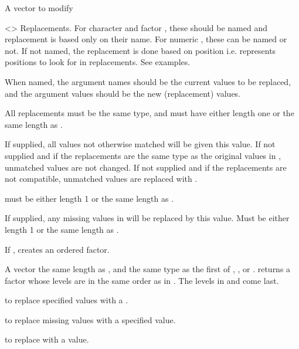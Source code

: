 \documentclass[a4paper]{book}
\begin{document}
\begin{Arguments}
\begin{ldescription}
\item[\code{.x}] A vector to modify

\item[\code{...}] <> Replacements. For character and factor , these should be named
and replacement is based only on their name. For numeric , these can be
named or not. If not named, the replacement is done based on position i.e.
 represents positions to look for in replacements. See examples.

When named, the argument names should be the current values to be replaced, and the
argument values should be the new (replacement) values.

All replacements must be the same type, and must have either
length one or the same length as .

\item[\code{.default}] If supplied, all values not otherwise matched will
be given this value. If not supplied and if the replacements are
the same type as the original values in , unmatched
values are not changed. If not supplied and if the replacements
are not compatible, unmatched values are replaced with .

 must be either length 1 or the same length as
.

\item[\code{.missing}] If supplied, any missing values in  will be
replaced by this value. Must be either length 1 or the same length as
.

\item[\code{.ordered}] If ,  creates an
ordered factor.
\end{ldescription}
\end{Arguments}
%
\begin{Value}
A vector the same length as , and the same type as
the first of , , or .
 returns a factor whose levels are in the same order as
in . The levels in  and  come last.
\end{Value}
%
\begin{SeeAlso}
 to replace specified values with a .

 to replace missing values with a specified value.

 to replace  with a value.
\end{SeeAlso}
\end{document}
